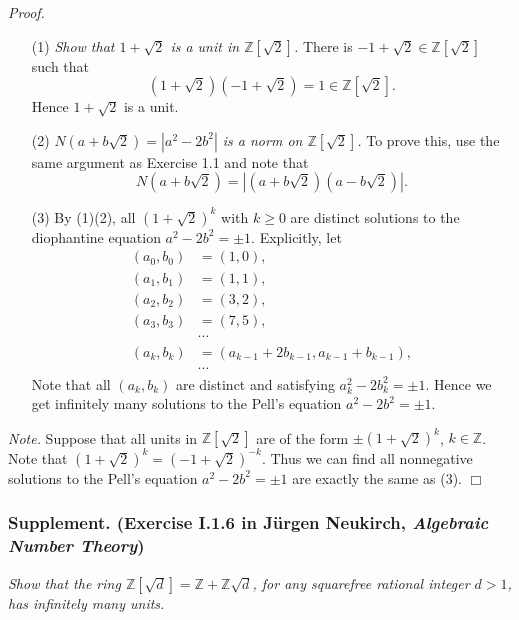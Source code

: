 \documentclass{article}
\begin{document}
\emph{Proof.}
\begin{enumerate}
\item[(1)]
\emph{Show that $1+\sqrt{2}$ is a unit in $\mathbb{Z}[\sqrt{2}]$.}
There is $-1+\sqrt{2} \in \mathbb{Z}[\sqrt{2}]$
such that $$(1+\sqrt{2})(-1+\sqrt{2}) = 1 \in \mathbb{Z}[\sqrt{2}].$$
Hence $1+\sqrt{2}$ is a unit.
\item[(2)]
\emph{$N(a+b\sqrt{2}) = |a^2 - 2b^2|$ is a norm on $\mathbb{Z}[\sqrt{2}]$.}
To prove this, use the same argument as Exercise 1.1 and note that
$$N(a+b\sqrt{2}) = |(a+b\sqrt{2})(a-b\sqrt{2})|.$$
\item[(3)]
By (1)(2),
all $(1+\sqrt{2})^k$ with $k \geq 0$
are distinct solutions to the diophantine equation $a^2 - 2b^2 = \pm 1$.
Explicitly, let
\begin{align*}
  (a_0,b_0) &= (1,0), \\
  (a_1,b_1) &= (1,1), \\
  (a_2,b_2) &= (3,2), \\
  (a_3,b_3) &= (7,5), \\
  &\cdots \\
  (a_k,b_k) &= (a_{k-1}+2b_{k-1},a_{k-1}+b_{k-1}), \\
  &\cdots
\end{align*}
Note that all $(a_k,b_k)$ are distinct and satisfying $a_k^2 - 2b_k^2 = \pm 1$.
Hence we get infinitely many solutions to the Pell's equation $a^2 - 2b^2 = \pm 1$.
\end{enumerate}

\emph{Note.}
Suppose that all units in $\mathbb{Z}[\sqrt{2}]$
are of the form $\pm(1+\sqrt{2})^k$, $k \in \mathbb{Z}$.
Note that $(1+\sqrt{2})^k = (-1+\sqrt{2})^{-k}$.
Thus we can find all nonnegative solutions to the Pell's equation $a^2 - 2b^2 = \pm 1$
are exactly the same as (3).
$\Box$ \\



\subsubsection*{Supplement. (Exercise I.1.6 in J\"urgen Neukirch, \emph{Algebraic Number Theory})}
\emph{Show that the ring $\mathbb{Z}[\sqrt{d}] = \mathbb{Z} + \mathbb{Z}\sqrt{d}$,
for any squarefree rational integer $d > 1$, has infinitely many units.} \\
\end{document}
